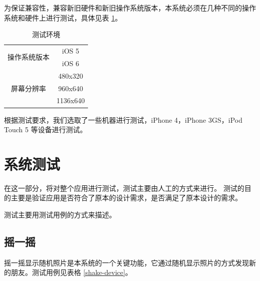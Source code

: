 为保证兼容性，兼容新旧硬件和新旧操作系统版本，本系统必须在几种不同的操作系统和硬件上进行测试，具体见表 \ref{env-spec}。

\begin{table}
    \centering
    \caption{测试环境}
    \label{env-spec}
    \begin{tabular}{c|c}
        \hline
        \multirow{2}{*}{操作系统版本} & iOS 5 \\
                                    & iOS 6 \\ \hline
        \multirow{3}{*}{屏幕分辨率}   & 480x320 \\
                                     & 960x640 \\
                                     & 1136x640 \\ \hline
    \end{tabular}
\end{table}

根据测试要求，我们选取了一些机器进行测试，iPhone 4，iPhone 3GS，iPod Touch 5 等设备进行测试。

\section{系统测试}

在这一部分，将对整个应用进行测试，测试主要由人工的方式来进行。
测试的目的主要是验证应用是否符合了原本的设计需求，是否满足了原本设计的需求。

测试主要用测试用例的方式来描述。

\subsection{摇一摇}

摇一摇显示随机照片是本系统的一个关键功能，它通过随机显示照片的方式发现新的朋友。测试用例见表格 \ref{shake-device}。

